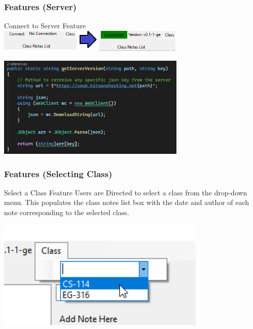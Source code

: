 \documentclass[aspectratio=169]{beamer}
\begin{document}
\begin{frame}
    \frametitle{Features (Server)}

    \begin{block}{\centering Connect to Server Feature}
        \centering \includegraphics [width=9cm] {connect_to_connected.png}
    \end{block}
    \centering\includegraphics [width=9cm] {getServerVersion.PNG}

\end{frame}

\begin{frame}
    \frametitle{Features (Selecting Class)}

    \begin{block}{\centering Select a Class Feature}
        \centering Users are Directed to select a class from the drop-down menu. This populates the class notes list box with the date and author of each note corresponding to the selected class.
    \end{block}

    \centering \includegraphics [width=10cm] {select}

\end{frame}
\end{document}
